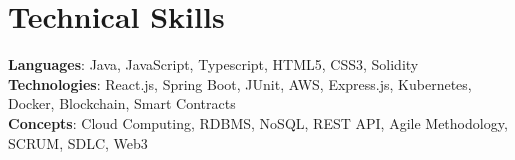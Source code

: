 \section{Technical Skills}
    \begin{itemize}[leftmargin=0.15in, label={}]
	\small{\item{
		\textbf{Languages}{: Java, JavaScript, Typescript, HTML5, CSS3, Solidity} \\
		\textbf{Technologies}{: React.js, Spring Boot, JUnit, AWS, Express.js, Kubernetes, Docker, Blockchain, Smart Contracts} \\
		\textbf{Concepts}{: Cloud Computing, RDBMS, NoSQL, REST API, Agile Methodology, SCRUM, SDLC, Web3}
	}}
    \end{itemize}